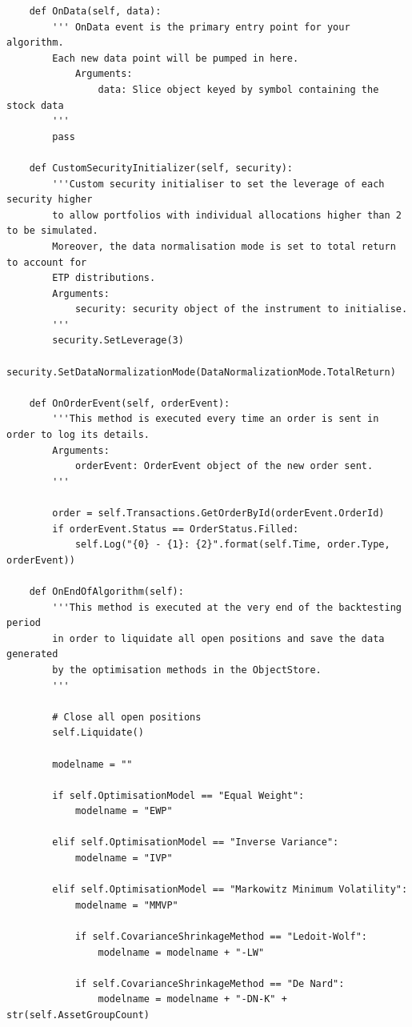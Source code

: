 \begin{verbatim}
    def OnData(self, data):
        ''' OnData event is the primary entry point for your algorithm.
        Each new data point will be pumped in here.
            Arguments:
                data: Slice object keyed by symbol containing the stock data
        '''
        pass
        
    def CustomSecurityInitializer(self, security):
        '''Custom security initialiser to set the leverage of each security higher
        to allow portfolios with individual allocations higher than 2 to be simulated.
        Moreover, the data normalisation mode is set to total return to account for
        ETP distributions.
        Arguments:
            security: security object of the instrument to initialise.
        '''
        security.SetLeverage(3)
        security.SetDataNormalizationMode(DataNormalizationMode.TotalReturn)
        
    def OnOrderEvent(self, orderEvent):
        '''This method is executed every time an order is sent in order to log its details.
        Arguments:
            orderEvent: OrderEvent object of the new order sent.
        '''
        
        order = self.Transactions.GetOrderById(orderEvent.OrderId)
        if orderEvent.Status == OrderStatus.Filled: 
            self.Log("{0} - {1}: {2}".format(self.Time, order.Type, orderEvent))
        
    def OnEndOfAlgorithm(self):
        '''This method is executed at the very end of the backtesting period
        in order to liquidate all open positions and save the data generated
        by the optimisation methods in the ObjectStore.
        '''
        
        # Close all open positions
        self.Liquidate()
        
        modelname = ""
        
        if self.OptimisationModel == "Equal Weight":
            modelname = "EWP"
            
        elif self.OptimisationModel == "Inverse Variance":
            modelname = "IVP"
            
        elif self.OptimisationModel == "Markowitz Minimum Volatility":
            modelname = "MMVP"
            
            if self.CovarianceShrinkageMethod == "Ledoit-Wolf":
                modelname = modelname + "-LW"
                
            if self.CovarianceShrinkageMethod == "De Nard":
                modelname = modelname + "-DN-K" + str(self.AssetGroupCount)
            

\end{verbatim}
